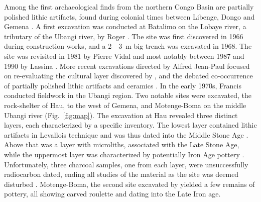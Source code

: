 \documentclass[smallextended,natbib]{svjour3}       %
\begin{document}
Among the first archaeological finds from the northern Congo Basin are partially polished lithic artifacts, found during colonial times between Libenge, Dongo and Gemena \citep{Bequaert.1937,Bequaert.1938a,Bequaert.1940a,Bequaert.1946}. A first excavation was conducted at Batalimo on the Lobaye river, a tributary of the Ubangi river, by Roger \citet{DeBayleDesHermens.1969,DeBayleDesHermens.1971,deBayledesHermens.1975}. The site was first discovered in 1966 during construction works, and a 2~\texttimes~3~m big trench was excavated in 1968. The site was revisited in 1981 by Pierre Vidal and most notably between 1987 and 1990 by Lassina \citet{Kote.1992}. More recent excavations directed by Alfred Jean-Paul \citet{Ndanga.2010} focused on re-evaluating the cultural layer discovered by \citet{deBayledesHermens.1975}, and the debated co-occurrence of partially polished lithic artifacts and ceramics \citep[137]{Eggert.1987a}. In the early 1970s, Francis \citet{vanNoten.1978} conducted fieldwork in the Ubangi region. Two notable sites were excavated, the rock-shelter of Hau, to the west of Gemena, and Motenge-Boma on the middle Ubangi river (Fig.~\ref{fig:map}). The excavation at Hau revealed three distinct layers, each characterized by a specific inventory. The lowest layer contained lithic artifacts in Levallois technique and was thus dated into the Middle Stone Age \citep[27,30]{vanNoten.1982d}. Above that was a layer with microliths, associated with the Late Stone Age, while the uppermost layer was characterized by potentially Iron Age pottery \citep[31]{Bahuchet.1992}. Unfortunately, three charcoal samples, one from each layer, were unsuccessfully radiocarbon dated, ending all studies of the material as the site was deemed disturbed \citep[27,30]{vanNoten.1982d}. Motenge-Boma, the second site excavated by \citet{vanNoten.1978} yielded a few remains of pottery, all showing carved roulette \citep[Fig.~40]{vanNoten.1982} and dating into the Late Iron age.
\end{document}
